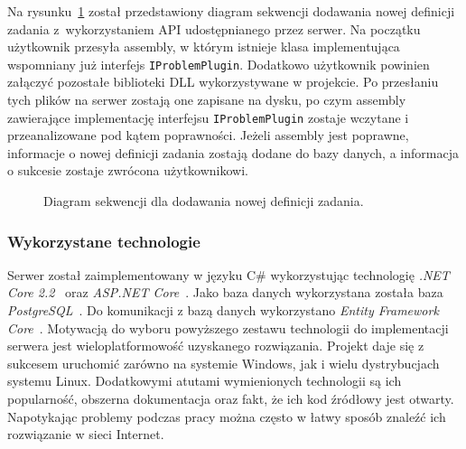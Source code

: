 \documentclass[a4paper,11pt,twoside]{report}
\theoremstyle{definition}
\begin{document}
Na rysunku~\ref{task-definition-sequence-diagram} został przedstawiony diagram sekwencji dodawania nowej definicji zadania z~wykorzystaniem API udostępnianego przez serwer. 
Na początku użytkownik przesyła assembly, w którym istnieje klasa implementująca wspomniany już interfejs \texttt{IProblemPlugin}.
Dodatkowo użytkownik powinien załączyć pozostałe biblioteki DLL wykorzystywane w projekcie.
Po przesłaniu tych plików na serwer zostają one zapisane na dysku, po czym assembly zawierające implementację interfejsu \texttt{IProblemPlugin} zostaje wczytane i przeanalizowane pod kątem poprawności.
Jeżeli assembly jest poprawne, informacje o nowej definicji zadania zostają dodane do bazy danych, a informacja o sukcesie zostaje zwrócona użytkownikowi.

\begin{figure} 
    \caption{Diagram sekwencji dla dodawania nowej definicji zadania.}
    \label{task-definition-sequence-diagram}
\end{figure}

\subsubsection{Wykorzystane technologie}
Serwer został zaimplementowany w języku C\# wykorzystując technologię \textit{.NET Core 2.2}~\cite{dotnet-core} oraz \textit{ASP.NET Core}~\cite{aspnet-core}. Jako baza danych wykorzystana została baza \textit{PostgreSQL}~\cite{postgresql}. Do komunikacji z bazą danych wykorzystano \textit{Entity Framework Core}~\cite{ef-core}. 
Motywacją do wyboru powyższego zestawu technologii do implementacji serwera jest wieloplatformowość uzyskanego rozwiązania. 
Projekt daje się z sukcesem uruchomić zarówno na systemie Windows, jak i wielu dystrybucjach systemu Linux. 
Dodatkowymi atutami wymienionych technologii są ich popularność, obszerna dokumentacja oraz fakt, że ich kod źródłowy jest otwarty. Napotykając problemy podczas pracy można często w łatwy sposób znaleźć ich rozwiązanie w sieci Internet.
\end{document}
